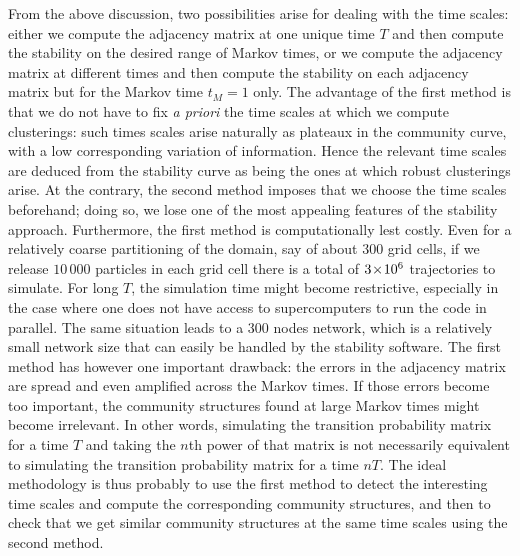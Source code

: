 From the above discussion, two possibilities arise for dealing with the time scales: either we compute the adjacency matrix at one unique time $T$ and then compute the stability on the desired range of Markov times, or we compute the adjacency matrix at different times and then compute the stability on each adjacency matrix but for the Markov time $t_M = 1$ only. The advantage of the first method is that we do not have to fix \textit{a priori} the time scales at which we compute clusterings: such times scales arise naturally as plateaux in the community curve, with a low corresponding variation of information. Hence the relevant time scales are deduced from the stability curve as being the ones at which robust clusterings arise. At the contrary, the second method imposes that we choose the time scales beforehand; doing so, we lose one of the most appealing features of the stability approach. Furthermore, the first method is computationally lest costly. Even for a relatively coarse partitioning of the domain, say of about $300$ grid cells, if we release $10\,000$ particles in each grid cell there is a total of $3\!\times\!10^{6}$ trajectories to simulate. For long $T$, the simulation time might become restrictive, especially in the case where one does not have access to supercomputers to run the code in parallel. The same situation leads to a $300$ nodes network, which is a relatively small network size that can easily be handled by the stability software. The first method has however one important drawback: the errors in the adjacency matrix are spread and even amplified across the Markov times. If those errors become too important, the community structures found at large Markov times might become irrelevant. In other words, simulating the transition probability matrix for a time $T$ and taking the $n$th power of that matrix is not necessarily equivalent to simulating the transition probability matrix for a time $nT$. The ideal methodology is thus probably to use the first method to detect the interesting time scales and compute the corresponding community structures, and then to check that we get similar community structures at the same time scales using the second method.


